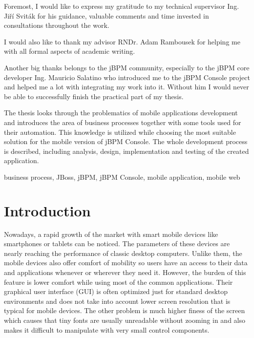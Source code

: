 \documentclass[12pt,oneside,final]{fithesis2}
\begin{document}
\FrontMatter
\ThesisTitlePage

\begin{ThesisDeclaration}
\DeclarationText
\AdvisorName
\end{ThesisDeclaration}

\begin{ThesisThanks}
Foremost, I would like to express my gratitude to my technical supervisor Ing. Jiří Sviták for his guidance, valuable comments and time invested in consultations throughout the work.

I would also like to thank my advisor RNDr. Adam Rambousek for helping me with all formal aspects of academic writing.

Another big thanks belongs to the jBPM community, especially to the jBPM core developer Ing. Mauricio Salatino who introduced me to the jBPM Console project and helped me a lot with integrating my work into it.
Without him I would never be able to successfully finish the practical part of my thesis.
\end{ThesisThanks}

\begin{ThesisAbstract}
The thesis looks through the problematics of mobile applications development and introduces the area of business processes together with some tools used for their automation.
This knowledge is utilized while choosing the most suitable solution for the mobile version of jBPM Console.
The whole development process is described, including analysis, design, implementation and testing of the created application.
\end{ThesisAbstract}

\begin{ThesisKeyWords}
business process, JBoss, jBPM, jBPM Console, mobile application, mobile web
\end{ThesisKeyWords}

\tableofcontents

\MainMatter
\chapter{Introduction}
Nowadays, a rapid growth of the market with smart mobile devices like smartphones or tablets can be noticed.
The parameters of these devices are nearly reaching the performance of classic desktop computers.
Unlike them, the mobile devices also offer comfort of mobility so users have an access to their data and applications whenever or wherever they need it.
However, the burden of this feature is lower comfort while using most of the common applications.
Their graphical user interface (GUI) is often optimized just for standard desktop environments and does not take into account lower screen resolution that is typical for mobile devices.
The other problem is much higher finess of the screen which causes that tiny fonts are usually unreadable without zooming in and also makes it difficult to manipulate with very small control components.
\end{document}
